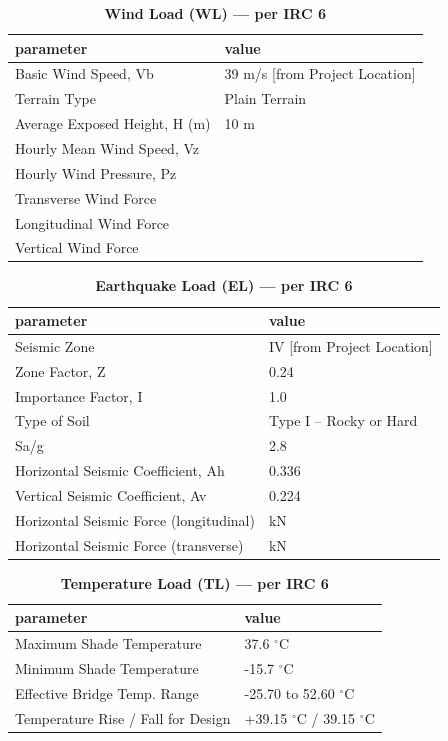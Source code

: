 \documentclass[12pt,a4paper]{report}
\numberwithin{table}{chapter}
\numberwithin{figure}{chapter}
\begin{document}
\vspace{1em}
\begin{longtable}{|L{5.5cm}|p{10.0cm}|}
\caption{\textbf{Wind Load (WL) --- per IRC 6}}
\hline
\textbf{parameter} & \textbf{value} \\
\hline
\textnormal{Basic Wind Speed, Vb} & 39 m/s [from Project Location] \\[6pt]
\hline
\textnormal{Terrain Type} & Plain Terrain \\[6pt]
\hline
\textnormal{Average Exposed Height, H (m)} & 10 m \\[6pt]
\hline
\textnormal{Hourly Mean Wind Speed, Vz} &  \\[6pt]
\hline
\textnormal{Hourly Wind Pressure, Pz} &  \\[6pt]
\hline
\textnormal{Transverse Wind Force} &  \\[6pt]
\hline
\textnormal{Longitudinal Wind Force} &  \\[6pt]
\hline
\textnormal{Vertical Wind Force} &  \\[6pt]
\hline
\end{longtable}

\vspace{1em}
\begin{longtable}{|L{5.5cm}|p{10.0cm}|}
\caption{\textbf{Earthquake Load (EL) --- per IRC 6}}
\hline
\textbf{parameter} & \textbf{value} \\
\hline
\textnormal{Seismic Zone} & IV [from Project Location] \\[6pt]
\hline
\textnormal{Zone Factor, Z} & 0.24 \\[6pt]
\hline
\textnormal{Importance Factor, I} & 1.0 \\[6pt]
\hline
\textnormal{Type of Soil} & Type I – Rocky or Hard \\[6pt]
\hline
\textnormal{Sa/g} & 2.8 \\[6pt]
\hline
\textnormal{Horizontal Seismic Coefficient, Ah} & 0.336 \\[6pt]
\hline
\textnormal{Vertical Seismic Coefficient, Av} & 0.224 \\[6pt]
\hline
\textnormal{Horizontal Seismic Force (longitudinal)} &  kN \\[6pt]
\hline
\textnormal{Horizontal Seismic Force (transverse)} &  kN \\[6pt]
\hline
\end{longtable}

\vspace{1em}
\begin{longtable}{|L{5.5cm}|p{10.0cm}|}
\caption{\textbf{Temperature Load (TL) --- per IRC 6}}
\hline
\textbf{parameter} & \textbf{value} \\
\hline
\textnormal{Maximum Shade Temperature} & 37.6 $^\circ$C \\[6pt]
\hline
\textnormal{Minimum Shade Temperature} & -15.7 $^\circ$C \\[6pt]
\hline
\textnormal{Effective Bridge Temp. Range} & -25.70 to 52.60 $^\circ$C \\[6pt]
\hline
\textnormal{Temperature Rise / Fall for Design} & +39.15 $^\circ$C / \textminus{}39.15 $^\circ$C \\[6pt]
\hline
\end{longtable}
\end{document}
